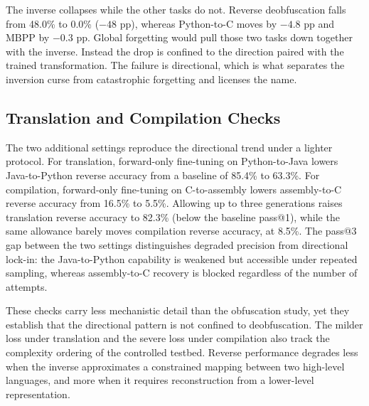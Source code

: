 The inverse collapses while the other tasks do not. Reverse deobfuscation
falls from 48.0\% to 0.0\% ($-48$ pp), whereas Python-to-C moves by $-4.8$ pp
and MBPP by $-0.3$ pp. Global forgetting would pull those two tasks down
together with the inverse. Instead the drop is confined to the direction paired
with the trained transformation. The failure is directional, which is what
separates the inversion curse from catastrophic forgetting and licenses the name.

\subsection{Translation and Compilation Checks}
\label{sec:transl-compil}

The two additional settings reproduce the directional trend under a lighter
protocol. For translation, forward-only fine-tuning on Python-to-Java lowers
Java-to-Python reverse accuracy from a baseline of 85.4\% to 63.3\%. For
compilation, forward-only fine-tuning on C-to-assembly lowers assembly-to-C
reverse accuracy from 16.5\% to 5.5\%. Allowing up to three generations raises translation reverse accuracy to 82.3\% (below the baseline pass@1), while the same allowance barely moves compilation reverse accuracy, at 8.5\%. The pass@3 gap between the two settings distinguishes degraded precision from
directional lock-in: the Java-to-Python capability is weakened but accessible
under repeated sampling, whereas assembly-to-C recovery is blocked regardless
of the number of attempts.

These checks carry less mechanistic detail than the obfuscation study, yet they
establish that the directional pattern is not confined to deobfuscation. The
milder loss under translation and the severe loss under compilation also track
the complexity ordering of the controlled testbed. Reverse performance degrades
less when the inverse approximates a constrained mapping between two high-level
languages, and more when it requires reconstruction from a lower-level
representation.
